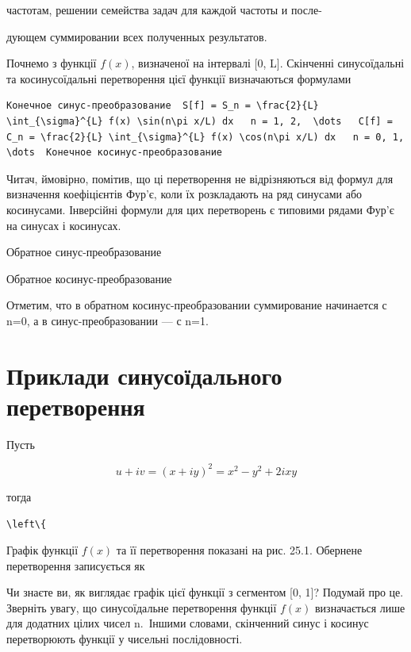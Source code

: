 \documentclass[
  ukrainian,
]{article}
\begin{document}
частотам, решении семейства задач для каждой частоты и после-

дующем суммировании всех полученных результатов.

Почнемо з функції \(f(x)\), визначеної на інтервалі {[}0, L{]}.
Скінченні синусоїдальні та косинусоїдальні перетворення цієї функції
визначаються формулами

\begin{verbatim}
Конечное синус-преобразование  S[f] = S_n = \frac{2}{L} \int_{\sigma}^{L} f(x) \sin(n\pi x/L) dx   n = 1, 2,  \dots   C[f] = C_n = \frac{2}{L} \int_{\sigma}^{L} f(x) \cos(n\pi x/L) dx   n = 0, 1, \dots  Конечное косинус-преобразование
\end{verbatim}

Читач, ймовірно, помітив, що ці перетворення не відрізняються від формул
для визначення коефіцієнтів Фур'є, коли їх розкладають на ряд синусами
або косинусами. Інверсійні формули для цих перетворень є типовими рядами
Фур'є на синусах і косинусах.

Обратное синус-преобразование

Обратное косинус-преобразование

Отметим, что в обратном косинус-преобразовании суммирование начинается с
n=0, а в синус-преобразовании --- с n=1.

\section{Приклади синусоїдального
перетворення}\label{ux43fux440ux438ux43aux43bux430ux434ux438-ux441ux438ux43dux443ux441ux43eux457ux434ux430ux43bux44cux43dux43eux433ux43e-ux43fux435ux440ux435ux442ux432ux43eux440ux435ux43dux43dux44f}

Пусть

\[
u + iv = (x + iy)^2 = x^2 - y^2 + 2ixy
\]

тогда

\begin{verbatim}
\left\{
\end{verbatim}

Графік функції \(f(x)\) та її перетворення показані на рис. 25.1.
Обернене перетворення записується як

Чи знаєте ви, як виглядає графік цієї функції з сегментом {[}0, 1{]}?
Подумай про це. Зверніть увагу, що синусоїдальне перетворення функції
\(f(x)\) визначається лише для додатних цілих чисел n.~Іншими словами,
скінченний синус і косинус перетворюють функції у чисельні
послідовності.
\end{document}

